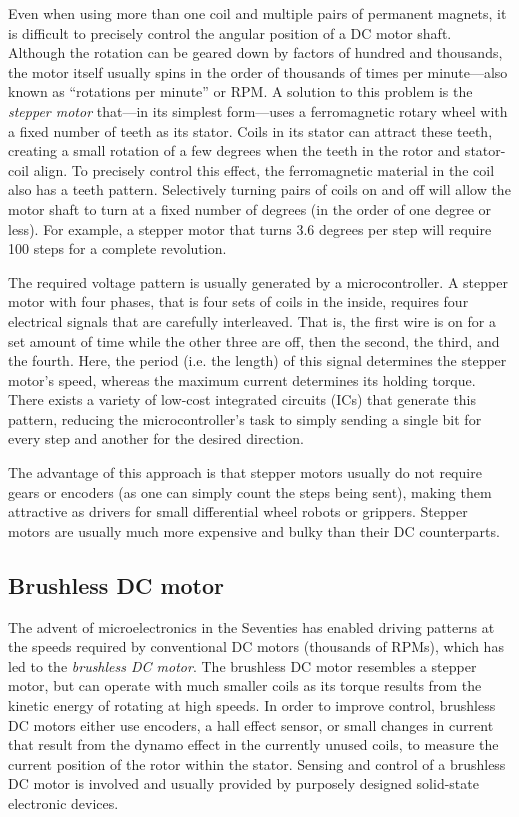 Even when using more than one coil and multiple pairs of permanent magnets, it is difficult to precisely control the angular position of a DC motor shaft. Although the rotation can be geared down by factors of hundred and thousands, the motor itself usually spins in the order of thousands of times per minute---also known as ``rotations per minute'' or RPM.
%
A solution to this problem is the \textsl{stepper motor} that---in its simplest form---uses a ferromagnetic rotary wheel with a fixed number of teeth as its stator. Coils in its stator can attract these teeth, creating a small rotation of a few degrees when the teeth in the rotor and stator-coil align. To precisely control this effect, the ferromagnetic material in the coil also has a teeth pattern. Selectively turning pairs of coils on and off will allow the motor shaft to turn at a fixed number of degrees (in the order of one degree or less). For example, a stepper motor that turns 3.6 degrees per step will require 100 steps for a complete revolution.

The required voltage pattern is usually generated by a microcontroller. A stepper motor with four phases, that is four sets of coils in the inside, requires four electrical signals that are carefully interleaved. That is, the first wire is on for a set amount of time while the other three are off, then the second, the third, and the fourth.
Here, the period (i.e. the length) of this signal determines the stepper motor's speed, whereas the maximum current determines its holding torque.
There exists a variety of low-cost integrated circuits (ICs) that generate this pattern, reducing the microcontroller's task to simply sending a single bit for every step and another for the desired direction.

The advantage of this approach is that stepper motors usually do not require gears or encoders (as one can simply count the steps being sent), making them attractive as drivers for small differential wheel robots or grippers. Stepper motors are usually much more expensive and bulky than their DC counterparts.

\subsection{Brushless DC motor}\label{sec:brushlessDC}

The advent of microelectronics in the Seventies has enabled driving patterns at the speeds required by conventional DC motors (thousands of RPMs), which has led to the \textsl{brushless DC motor}. The brushless DC motor resembles a stepper motor, but can operate with much smaller coils as its torque results from the kinetic energy of rotating at high speeds. In order to improve control, brushless DC motors either use encoders, a hall effect sensor, or small changes in current that result from the dynamo effect in the currently unused coils, to measure the current position of the rotor within the stator. Sensing and control of a brushless DC motor is involved and usually provided by purposely designed solid-state electronic devices.


